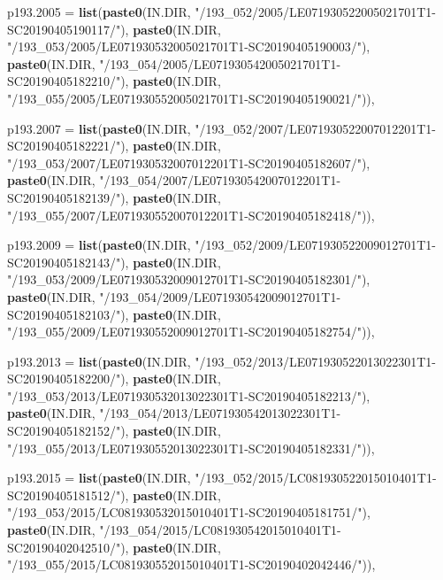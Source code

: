 \documentclass[a4paper, notitlepage, 12pt, krantz2]{krantz}
\newenvironment{Shaded}{\begin{snugshade}}{\end{snugshade}}
\newcommand{\DataTypeTok}[1]{\textcolor[rgb]{0.13,0.29,0.53}{#1}}
\newcommand{\KeywordTok}[1]{\textcolor[rgb]{0.13,0.29,0.53}{\textbf{#1}}}
\newcommand{\NormalTok}[1]{#1}
\newcommand{\StringTok}[1]{\textcolor[rgb]{0.31,0.60,0.02}{#1}}
\begin{document}
\begin{Shaded}
\begin{Highlighting}[]
  \DataTypeTok{p193.2005 =} \KeywordTok{list}\NormalTok{(}\KeywordTok{paste0}\NormalTok{(IN.DIR, }\StringTok{"/193_052/2005/LE071930522005021701T1-SC20190405190117/"}\NormalTok{),}
                   \KeywordTok{paste0}\NormalTok{(IN.DIR, }\StringTok{"/193_053/2005/LE071930532005021701T1-SC20190405190003/"}\NormalTok{),}
                   \KeywordTok{paste0}\NormalTok{(IN.DIR, }\StringTok{"/193_054/2005/LE071930542005021701T1-SC20190405182210/"}\NormalTok{),}
                   \KeywordTok{paste0}\NormalTok{(IN.DIR, }\StringTok{"/193_055/2005/LE071930552005021701T1-SC20190405190021/"}\NormalTok{)),}

  \DataTypeTok{p193.2007 =} \KeywordTok{list}\NormalTok{(}\KeywordTok{paste0}\NormalTok{(IN.DIR, }\StringTok{"/193_052/2007/LE071930522007012201T1-SC20190405182221/"}\NormalTok{),}
                   \KeywordTok{paste0}\NormalTok{(IN.DIR, }\StringTok{"/193_053/2007/LE071930532007012201T1-SC20190405182607/"}\NormalTok{),}
                   \KeywordTok{paste0}\NormalTok{(IN.DIR, }\StringTok{"/193_054/2007/LE071930542007012201T1-SC20190405182139/"}\NormalTok{),}
                   \KeywordTok{paste0}\NormalTok{(IN.DIR, }\StringTok{"/193_055/2007/LE071930552007012201T1-SC20190405182418/"}\NormalTok{)),}

  \DataTypeTok{p193.2009 =} \KeywordTok{list}\NormalTok{(}\KeywordTok{paste0}\NormalTok{(IN.DIR, }\StringTok{"/193_052/2009/LE071930522009012701T1-SC20190405182143/"}\NormalTok{),}
                   \KeywordTok{paste0}\NormalTok{(IN.DIR, }\StringTok{"/193_053/2009/LE071930532009012701T1-SC20190405182301/"}\NormalTok{),}
                   \KeywordTok{paste0}\NormalTok{(IN.DIR, }\StringTok{"/193_054/2009/LE071930542009012701T1-SC20190405182103/"}\NormalTok{),}
                   \KeywordTok{paste0}\NormalTok{(IN.DIR, }\StringTok{"/193_055/2009/LE071930552009012701T1-SC20190405182754/"}\NormalTok{)),}

  \DataTypeTok{p193.2013 =} \KeywordTok{list}\NormalTok{(}\KeywordTok{paste0}\NormalTok{(IN.DIR, }\StringTok{"/193_052/2013/LE071930522013022301T1-SC20190405182200/"}\NormalTok{),}
                   \KeywordTok{paste0}\NormalTok{(IN.DIR, }\StringTok{"/193_053/2013/LE071930532013022301T1-SC20190405182213/"}\NormalTok{),}
                   \KeywordTok{paste0}\NormalTok{(IN.DIR, }\StringTok{"/193_054/2013/LE071930542013022301T1-SC20190405182152/"}\NormalTok{),}
                   \KeywordTok{paste0}\NormalTok{(IN.DIR, }\StringTok{"/193_055/2013/LE071930552013022301T1-SC20190405182331/"}\NormalTok{)),}

  \DataTypeTok{p193.2015 =} \KeywordTok{list}\NormalTok{(}\KeywordTok{paste0}\NormalTok{(IN.DIR, }\StringTok{"/193_052/2015/LC081930522015010401T1-SC20190405181512/"}\NormalTok{),}
                   \KeywordTok{paste0}\NormalTok{(IN.DIR, }\StringTok{"/193_053/2015/LC081930532015010401T1-SC20190405181751/"}\NormalTok{),}
                   \KeywordTok{paste0}\NormalTok{(IN.DIR, }\StringTok{"/193_054/2015/LC081930542015010401T1-SC20190402042510/"}\NormalTok{),}
                   \KeywordTok{paste0}\NormalTok{(IN.DIR, }\StringTok{"/193_055/2015/LC081930552015010401T1-SC20190402042446/"}\NormalTok{)),}


\end{Highlighting}
\end{Shaded}
\end{document}
